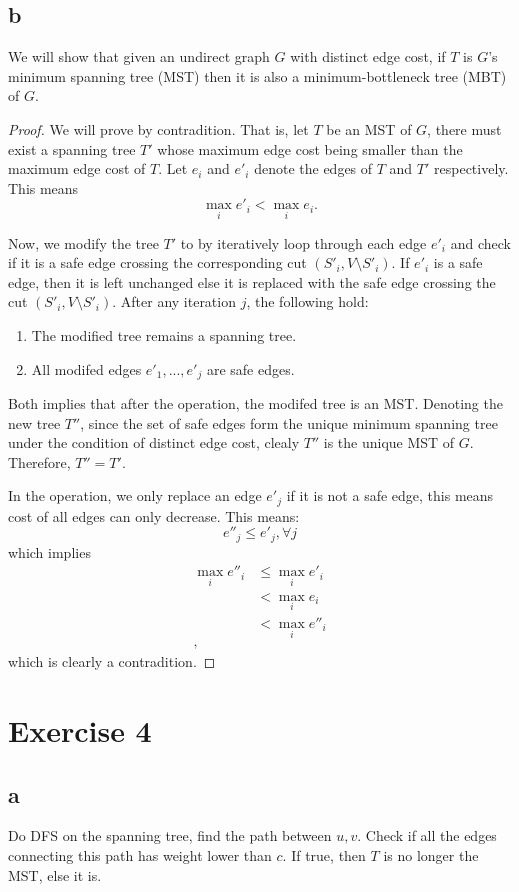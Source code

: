 \documentclass[a4paper,10pt,twoside]{article}
\newtheorem{proof}{Proof}
\begin{document}
\subsection*{b}
We will show that given an undirect graph $G$ with distinct edge
cost, if $T$ is $G$'s minimum spanning
tree (MST) then it is also a minimum-bottleneck tree (MBT) of $G$.
\begin{proof}
	We will prove by contradition. That is, let $T$ be an MST of $G$,
	there must exist a spanning tree $T'$ whose maximum edge cost
	being smaller than the maximum edge cost of $T$.
	Let $e_i$ and $e'_i$ denote the edges of $T$ and $T'$ respectively.
	This means
	\[
		\max_i{e'_i} < \max_i{e_i}.
	\]

	Now, we modify the tree $T'$ to by iteratively
	loop through each edge $e'_i$ and check if it is a safe edge crossing
	the corresponding cut $(S'_i, V\setminus S'_i)$. If $e'_i$ is a safe
	edge, then it is left unchanged else it is replaced with the safe edge
	crossing the cut $(S'_i, V\setminus S'_i)$.
	After any iteration $j$, the following hold:
	\begin{enumerate}
		\item The modified tree remains a spanning tree.
		\item All modifed edges $e'_1, ..., e'_j$ are safe edges.
	\end{enumerate}

	Both implies that after the operation, the modifed tree is an MST.
	Denoting the new tree $T''$, since the set of safe edges form the unique
	minimum spanning tree under the condition of distinct edge cost, clealy
	$T''$ is the unique MST of $G$. Therefore, $T'' = T'$.

	In the operation, we only replace an edge $e'_j$ if it is not a safe edge,
	this means cost of all edges can only decrease. This means:
	\[
		e''_j \leq e'_j, \forall j
	\]
	which implies
	\[
	\begin{aligned}
		\max_i e''_i &\leq \max_i e'_i \\
					 &< \max_i e_i\\
					 &< \max_i e''_i\\,
	\end{aligned}
	\]
	which is clearly a contradition.
\end{proof}
\section*{Exercise 4}
\subsection*{a}
Do DFS on the spanning tree, find the path between $u, v$.
Check if all the edges connecting this path has weight lower than $c$.
If true, then $T$ is no longer the MST, else it is.
\end{document}
